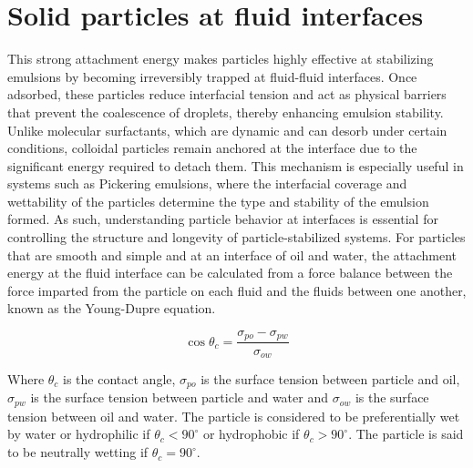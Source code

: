 \section{Solid particles at fluid interfaces}

This strong attachment energy makes particles highly effective at stabilizing emulsions by becoming irreversibly trapped at fluid-fluid interfaces. 
\cite{ngai_particle-stabilized_2015}Once adsorbed, these 
particles reduce interfacial tension and act as physical barriers that prevent the coalescence of droplets, thereby enhancing emulsion stability. Unlike molecular surfactants, 
which are dynamic and can desorb under certain conditions, colloidal particles remain anchored at the interface due to the significant energy required to detach them. 
\cite{ngai_particle-stabilized_2015}This mechanism 
is especially useful in systems such as Pickering emulsions, where the interfacial coverage and wettability of the particles determine the type and stability of the emulsion formed. 
\cite{ngai_particle-stabilized_2015,velankar_non-equilibrium_2015}
As such, understanding particle behavior at interfaces is essential for controlling the structure and longevity of particle-stabilized systems. \cite{ngai_particle-stabilized_2015}
For particles that are smooth and simple and at an interface of oil and water, the attachment energy at the fluid interface can be calculated from a force 
balance between the force imparted from the particle on each fluid and the fluids between one another, known as the Young-Dupre equation.

\begin{equation}
    \cos{\theta_c} = \frac{\sigma_{po} - \sigma_{pw}}{\sigma_{ow}}
\end{equation}

Where $\theta_c$ is the contact angle, $\sigma_{po}$ is the surface tension between particle and oil, $\sigma_{pw}$ is the surface tension between particle and water and
$\sigma_{ow}$ is the surface tension between oil and water. The particle is considered to be preferentially wet by water or hydrophilic if $\theta_c < 90 ^{\circ}$ or 
hydrophobic if $\theta_c > 90 ^{\circ}$. The particle is said to be neutrally wetting if $\theta_c = 90 ^{\circ}$. 

